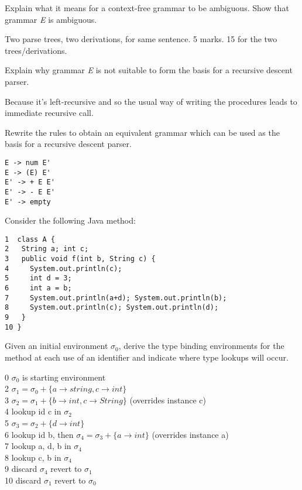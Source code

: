 \documentclass[11pt]{bareexam}
\begin{document}
\begin{questions}
\begin{subquestions}
\begin{subsubquestions}
\subsubquestion
Explain what it means for a context-free grammar to be ambiguous. 
Show that grammar {\it E\/} is ambiguous.

\begin{modelanswer}
Two parse trees, two derivations, for same sentence. 5 marks.
15 for the two trees/derivations.
\end{modelanswer}

\subsubquestion
Explain why grammar {\it E\/} is not suitable to form the basis for a 
recursive descent parser.

\begin{modelanswer}
Because it's left-recursive and so the usual way of writing the 
procedures leads to immediate recursive call.
\end{modelanswer}

\subsubquestion
Rewrite the rules to obtain an equivalent grammar which can
be used as the basis for a recursive descent parser.

\begin{modelanswer}
\begin{verbatim}
E -> num E'
E -> (E) E'
E' -> + E E'
E' -> - E E'
E' -> empty
\end{verbatim}
\end{modelanswer}

\end{subsubquestions}

\subquestion
Consider the following Java method:
\begin{verbatim}
1  class A {
2   String a; int c;
3   public void f(int b, String c) {
4     System.out.println(c);
5     int d = 3;
6     int a = b;
7     System.out.println(a+d); System.out.println(b);
8     System.out.println(c); System.out.println(d);
9   }
10 }
\end{verbatim}
Given an initial environment $\sigma_0$, 
derive the type binding environments for the method at each
use of an identifier and indicate where type lookups will occur.

\begin{modelanswer}
0  $\sigma_0$ is starting environment\\
2  $\sigma_1 = \sigma_0 + \{a\rightarrow string,c\rightarrow int\}$\\
3  $\sigma_2 = \sigma_1 + \{b\rightarrow int,c\rightarrow String\}$ (overrides instance c)\\
4  lookup id c  in $\sigma_2$\\
5  $\sigma_3 = \sigma_2 + \{d\rightarrow int\}$ \\
6  lookup id b, then $\sigma_4 = \sigma_3 + \{a\rightarrow int\}$ (overrides instance a)\\
7  lookup a, d, b  in $\sigma_4$\\
8  lookup c, b in $\sigma_4$\\
9  discard $\sigma_4$ revert to $\sigma_1$\\
10 discard $\sigma_1$ revert to $\sigma_0$
\end{modelanswer}



\end{subquestions}
\end{questions}
\end{document}
